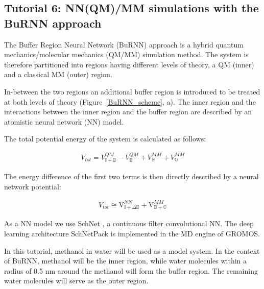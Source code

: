 
\subsection{Tutorial 6: NN(QM)/MM simulations with the BuRNN approach}

The Buffer Region Neural Network (BuRNN) approach \cite{Lier2022BuRNN} is a hybrid quantum mechanics/molecular mechanics (QM/MM) \cite{Warshel1976QM/MM, Senn2009QM/MM} simulation method. The system is therefore partitioned into regions having different levels of theory, a QM (inner) and a classical MM (outer) region. 

In-between the two regions an additional buffer region is introduced to be treated at both levels of theory (Figure~\ref{BuRNN_scheme}, a). The inner region and the interactions between the inner region and the buffer region are described by an atomistic neural network (NN) model.

The total potential energy of the system is calculated as follows:

\begin{equation}
  \begin{aligned}
  V_{tot} = V^{QM}_{\mathbb{I+B}} - V^{QM}_{\mathbb{B}} + V^{MM}_{\mathbb{B}} + V^{MM}_{\mathbb{O}}
    \end{aligned}
\end{equation}


 The energy difference of the first two terms is then directly described by a neural network potential: 
 
\begin{equation}
  \begin{aligned}
  V_{tot} \cong \mathrm{V}_{\mathbb{I+}\Delta\mathbb{B}}^{NN} + \mathrm{V}_{\mathbb{B+O}}^{MM}
    \end{aligned}
\end{equation}


As a NN model we use SchNet \cite{Schuett2017SchNet, Schuett2018SchNet}, a continuous filter convolutional NN. The deep learning architecture SchNetPack \cite{Schuett2019SPK} is implemented in the MD engine of GROMOS.



In this tutorial, methanol in water will be used as a model system. In the context of BuRNN, methanol will be the inner region, while water molecules within a radius of 0.5 nm around the methanol will form the buffer region. The remaining water molecules will serve as the outer region. 

